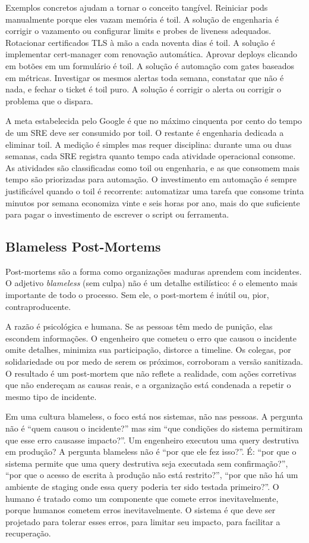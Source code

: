 Exemplos concretos ajudam a tornar o conceito tangível. Reiniciar pods
manualmente porque eles vazam memória é toil. A solução de engenharia é
corrigir o vazamento ou configurar limits e probes de liveness adequados.
Rotacionar certificados TLS à mão a cada noventa dias é toil. A solução
é implementar cert-manager com renovação automática. Aprovar deploys clicando
em botões em um formulário é toil. A solução é automação com gates baseados
em métricas. Investigar os mesmos alertas toda semana, constatar que não é nada,
e fechar o ticket é toil puro. A solução é corrigir o alerta ou corrigir o
problema que o dispara.

A meta estabelecida pelo Google é que no máximo cinquenta por cento do tempo de
um SRE deve ser consumido por toil. O restante é engenharia dedicada a eliminar
toil. A medição é simples mas requer disciplina: durante uma ou duas semanas,
cada SRE registra quanto tempo cada atividade operacional consome. As atividades
são classificadas como toil ou engenharia, e as que consomem mais tempo são
priorizadas para automação. O investimento em automação é sempre justificável
quando o toil é recorrente: automatizar uma tarefa que consome trinta minutos por
semana economiza vinte e seis horas por ano, mais do que suficiente para pagar
o investimento de escrever o script ou ferramenta.

\subsection{Blameless Post-Mortems}

Post-mortems são a forma como organizações maduras aprendem com incidentes.
O adjetivo \emph{blameless} (sem culpa) não é um detalhe estilístico: é o
elemento mais importante de todo o processo. Sem ele, o post-mortem é inútil ou,
pior, contraproducente.

A razão é psicológica e humana. Se as pessoas têm medo de punição,
elas escondem informações. O engenheiro que cometeu o erro que causou o incidente
omite detalhes, minimiza sua participação, distorce a timeline. Os colegas, por
solidariedade ou por medo de serem os próximos, corroboram a versão sanitizada.
O resultado é um post-mortem que não reflete a realidade, com ações corretivas
que não endereçam as causas reais, e a organização está condenada a repetir o
mesmo tipo de incidente.

Em uma cultura blameless, o foco está nos sistemas, não nas pessoas. A pergunta
não é ``quem causou o incidente?'' mas sim ``que condições do sistema permitiram
que esse erro causasse impacto?''. Um engenheiro executou uma query destrutiva em
produção? A pergunta blameless não é ``por que ele fez isso?''. É: ``por que
o sistema permite que uma query destrutiva seja executada sem confirmação?'', ``por
que o acesso de escrita à produção não está restrito?'', ``por que não há um
ambiente de staging onde essa query poderia ter sido testada primeiro?''. O humano
é tratado como um componente que comete erros inevitavelmente, porque humanos
cometem erros inevitavelmente. O sistema é que deve ser projetado para tolerar
esses erros, para limitar seu impacto, para facilitar a recuperação.

